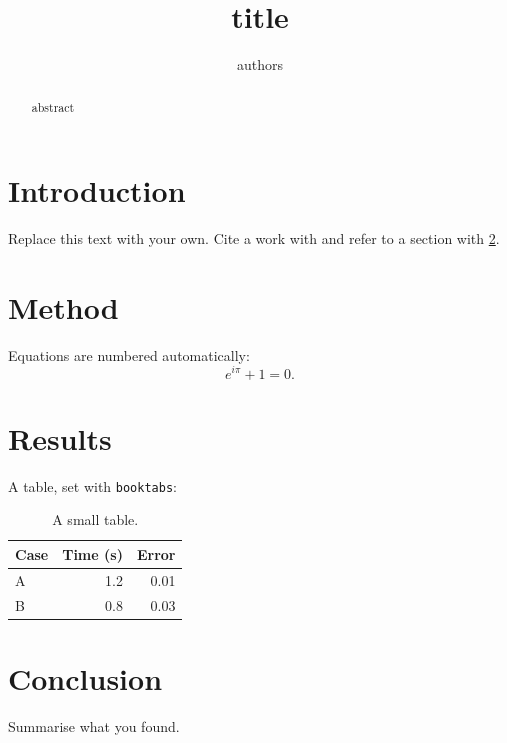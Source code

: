 \documentclass{llncs}
\begin{document}
\title{{{title}}}
\author{{{authors}}}
\maketitle
\begin{abstract}
{{abstract}}
\end{abstract}

\section{Introduction}
Replace this text with your own. Cite a work with \cite{knuth1984} and refer to a
section with \ref{sec:method}.

\section{Method}\label{sec:method}
Equations are numbered automatically:
\begin{equation}
  e^{i\pi} + 1 = 0.
\end{equation}

\section{Results}
A table, set with \texttt{booktabs}:
\begin{table}[h]
  \centering
  \begin{tabular}{lrr}
    \toprule
    Case & Time (s) & Error \\
    \midrule
    A & 1.2 & 0.01 \\
    B & 0.8 & 0.03 \\
    \bottomrule
  \end{tabular}
  \caption{A small table.}
  \label{tab:results}
\end{table}

\section{Conclusion}
Summarise what you found.



\end{document}
